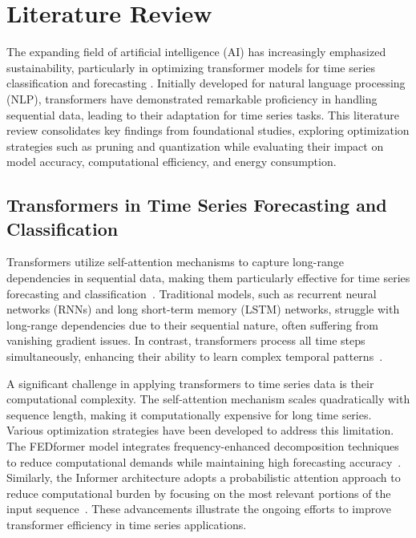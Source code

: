\section{Literature Review}
The expanding field of artificial intelligence (AI) has increasingly emphasized sustainability, particularly in optimizing transformer models for time series classification and forecasting \cite{Kaur2024LeveragingAI}. Initially developed for natural language processing (NLP), transformers have demonstrated remarkable proficiency in handling sequential data, leading to their adaptation for time series tasks. This literature review consolidates key findings from foundational studies, exploring optimization strategies such as pruning and quantization while evaluating their impact on model accuracy, computational efficiency, and energy consumption.

\subsection{Transformers in Time Series Forecasting and Classification}

Transformers utilize self-attention mechanisms to capture long-range dependencies in sequential data, making them particularly effective for time series forecasting and classification~\cite{Wen2022,vaswani2017attention}. Traditional models, such as recurrent neural networks (RNNs) and long short-term memory (LSTM) networks, struggle with long-range dependencies due to their sequential nature, often suffering from vanishing gradient issues. In contrast, transformers process all time steps simultaneously, enhancing their ability to learn complex temporal patterns~\cite{Zhou2021}.

A significant challenge in applying transformers to time series data is their computational complexity. The self-attention mechanism scales quadratically with sequence length, making it computationally expensive for long time series. Various optimization strategies have been developed to address this limitation. The FEDformer model integrates frequency-enhanced decomposition techniques to reduce computational demands while maintaining high forecasting accuracy~\cite{Tian2022}. Similarly, the Informer architecture adopts a probabilistic attention approach to reduce computational burden by focusing on the most relevant portions of the input sequence~\cite{Zhou2021}. These advancements illustrate the ongoing efforts to improve transformer efficiency in time series applications.


